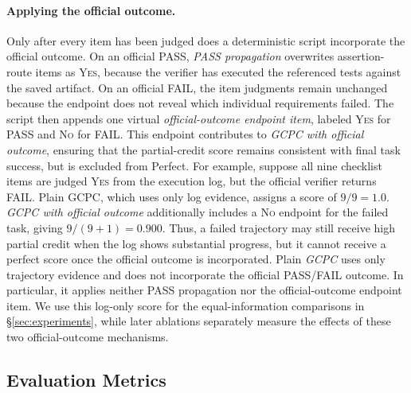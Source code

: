 \documentclass[sigconf,nonacm]{acmart}
\begin{document}
\paragraph{Applying the official outcome.}
Only after every item has been judged does a deterministic script incorporate the
official outcome. On an official PASS, \emph{PASS propagation} overwrites
assertion-route items as \textsc{Yes}, because the verifier has executed
the referenced tests against the saved artifact. On an official FAIL, the
item judgments remain unchanged because the endpoint does not reveal
which individual requirements failed. The script then appends one virtual
\emph{official-outcome endpoint item}, labeled \textsc{Yes} for PASS and
\textsc{No} for FAIL. This endpoint contributes to \emph{GCPC with official outcome}, ensuring that the partial-credit score remains consistent with final task success, but is excluded from Perfect. For example, suppose all nine checklist items are judged \textsc{Yes} from the execution log, but the official verifier returns FAIL. Plain GCPC, which uses only log evidence, assigns a score of $9/9=1.0$.  \emph{GCPC with official outcome} additionally includes a \textsc{No} endpoint for the failed task, giving $9/(9+1)=0.900$. Thus, a failed trajectory may still receive high partial credit when the log shows substantial progress, but it cannot receive a perfect score once the official outcome is incorporated. Plain \emph{GCPC} uses only trajectory evidence and does not incorporate the official PASS/FAIL outcome. In particular, it applies neither PASS propagation nor the official-outcome endpoint item. We use this log-only score for the equal-information comparisons in \S\ref{sec:experiments}, while later ablations separately measure the effects of these two official-outcome mechanisms.


\subsection{Evaluation Metrics}
\label{sec:metrics}
\end{document}
